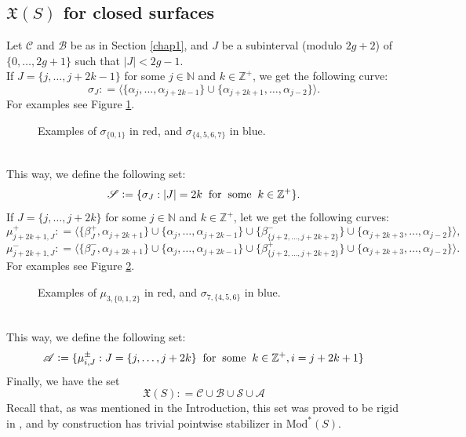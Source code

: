 \documentclass[twoside,11pt,a4paper]{article}
\newcommand*{\EMod}[1]{\mathrm{Mod}^{*}(#1)}
\newcommand*{\nat}{\mathbb{N}}
\newcommand*{\X}{\mathfrak{X}}
\newcommand*{\Cf}{\mathscr{C}}
\newcommand*{\Bf}{\mathscr{B}}
\newcommand*{\Sf}{\mathscr{S}}
\newcommand*{\Mf}{\mathscr{A}}
\newcommand*{\ColonEqq}{\mathrel{\mathop:}=}
\begin{document}
\subsection{$\X(S)$ for closed surfaces}\label{chap3sec1subsec1}
\indent Let $\Cf$ and $\Bf$ be as in Section \ref{chap1}, and $J$ be a subinterval (modulo $2g+2$) of $\{0, \ldots, 2g+1\}$ such that $|J| < 2g -1$.\\
\indent If $J = \{j, \ldots, j+ 2k-1\}$ for some $j \in \nat$ and $k \in \mathbb{Z}^{+}$, we get the following curve: $$\sigma_{J} \ColonEqq \langle \{\alpha_{j}, \ldots, \alpha_{j+2k-1}\} \cup \{\alpha_{j + 2k +1}, \ldots, \alpha_{j-2}\}\rangle.$$ For examples see Figure \ref{ExamplesSigmaSec3fig1}. 
\begin{figure}[h]
 \begin{center}
  \resizebox{10cm}{!}{} \caption{Examples of $\sigma_{\{0,1\}}$ in red, and $\sigma_{\{4,5,6,7\}}$ in blue.}\label{ExamplesSigmaSec3fig1}
 \end{center}
\end{figure}\\
This way, we define the following set: $$\Sf \ColonEqq \{\sigma_{J} : |J| = 2k \hspace{0.2cm} \mathrm{for} \hspace{0.2cm} \mathrm{some} \hspace{0.2cm} k \in \mathbb{Z}^{+}\}.$$
\indent If $J = \{j, \ldots, j + 2k\}$ for some $j \in \nat$ and $k \in \mathbb{Z}^{+}$, let we get the following curves:$$\mu_{j+2k+1, J}^{+} \ColonEqq \langle \{\beta_{J}^{+},\alpha_{j+2k+1}\} \cup \{\alpha_{j}, \ldots, \alpha_{j+2k-1}\} \cup \{\beta_{\{j+2, \ldots, j+2k+2\}}^{-}\} \cup \{\alpha_{j+2k+3}, \ldots, \alpha_{j-2}\} \rangle,$$ $$\mu_{j+2k+1, J}^{-} \ColonEqq \langle \{\beta_{J}^{-},\alpha_{j+2k+1}\} \cup \{\alpha_{j}, \ldots, \alpha_{j+2k-1}\} \cup \{\beta_{\{j+2, \ldots, j+2k+2\}}^{+}\} \cup \{\alpha_{j+2k+3}, \ldots, \alpha_{j-2}\} \rangle.$$ 
\indent For examples see Figure \ref{ExamplesMuSec3fig1}. 
\begin{figure}[h]
 \begin{center}
  \resizebox{10cm}{!}{} \caption{Examples of $\mu_{3,\{0,1,2\}}$ in red, and $\sigma_{7,\{4,5,6\}}$ in blue.}\label{ExamplesMuSec3fig1}
 \end{center}
\end{figure}\\
\indent This way, we define the following set: $$\Mf \ColonEqq \{\mu_{i,J}^{\pm}: J = \{j, \ldots, j+2k\}  \hspace{0.2cm} \mathrm{for} \hspace{0.2cm} \mathrm{some} \hspace{0.2cm} k \in \mathbb{Z}^{+}, i = j+2k+1\}$$
\indent Finally, we have the set $$\X(S) \ColonEqq \Cf \cup \Bf \cup \Sf \cup \Mf$$
\indent Recall that, as was mentioned in the Introduction, this set was proved to be rigid in \cite{Ara1}, and by construction has trivial pointwise stabilizer in $\EMod{S}$.
\end{document}
